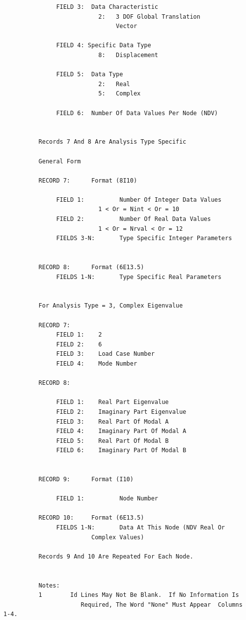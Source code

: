 \documentclass[11pt,openany,twoside]{book}
\numberwithin{equation}{section}		%
\begin{document}
\begin{verbatim}
               FIELD 3:  Data Characteristic
                           2:   3 DOF Global Translation
                                Vector

               FIELD 4: Specific Data Type
                           8:   Displacement

               FIELD 5:  Data Type
                           2:   Real
                           5:   Complex

               FIELD 6:  Number Of Data Values Per Node (NDV)


          Records 7 And 8 Are Analysis Type Specific

          General Form

          RECORD 7:      Format (8I10)

               FIELD 1:          Number Of Integer Data Values
                           1 < Or = Nint < Or = 10
               FIELD 2:          Number Of Real Data Values
                           1 < Or = Nrval < Or = 12
               FIELDS 3-N:       Type Specific Integer Parameters


          RECORD 8:      Format (6E13.5)
               FIELDS 1-N:       Type Specific Real Parameters


          For Analysis Type = 3, Complex Eigenvalue

          RECORD 7:
               FIELD 1:    2
               FIELD 2:    6
               FIELD 3:    Load Case Number
               FIELD 4:    Mode Number

          RECORD 8:

               FIELD 1:    Real Part Eigenvalue
               FIELD 2:    Imaginary Part Eigenvalue
               FIELD 3:    Real Part Of Modal A
               FIELD 4:    Imaginary Part Of Modal A
               FIELD 5:    Real Part Of Modal B
               FIELD 6:    Imaginary Part Of Modal B


          RECORD 9:      Format (I10)

               FIELD 1:          Node Number

          RECORD 10:     Format (6E13.5)
               FIELDS 1-N:       Data At This Node (NDV Real Or
                         Complex Values)

          Records 9 And 10 Are Repeated For Each Node.


          Notes:
          1        Id Lines May Not Be Blank.  If No Information Is
                      Required, The Word "None" Must Appear  Columns 1-4.


\end{verbatim}
\end{document}
